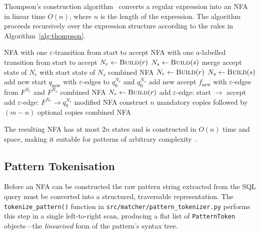 Thompson's construction algorithm~\cite{Thompson1968} converts a
regular expression into an NFA in linear time $O(n)$, where $n$ is
the length of the expression.  The algorithm proceeds recursively
over the expression structure according to the rules in
Algorithm~\ref{alg:thompson}.

\begin{algorithm}[htbp]
\caption{Thompson's NFA Construction}
\label{alg:thompson}
\begin{algorithmic}[1]
    \State \Return NFA with one $\varepsilon$-transition from start to accept
    \State \Return NFA with one $a$-labelled transition from start to accept
    \State $N_r \gets \Call{Build}{r}$
    \State $N_s \gets \Call{Build}{s}$
    \State merge accept state of $N_r$ with start state of $N_s$
    \State \Return combined NFA
    \State $N_r \gets \Call{Build}{r}$
    \State $N_s \gets \Call{Build}{s}$
    \State add new start $q_\text{new}$ with $\varepsilon$-edges to $q_0^{N_r}$ and $q_0^{N_s}$
    \State add new accept $f_\text{new}$ with $\varepsilon$-edges from $F^{N_r}$ and $F^{N_s}$
    \State \Return combined NFA
    \State $N_r \gets \Call{Build}{r}$
    \State add $\varepsilon$-edge: start $\to$ accept 
    \State add $\varepsilon$-edge: $F^{N_r} \to q_0^{N_r}$ 
    \State \Return modified NFA
    \State construct $n$ mandatory copies followed by $(m{-}n)$ optional copies
    \State \Return combined NFA
  \EndIf
\EndProcedure
\end{algorithmic}
\end{algorithm}

The resulting NFA has at most $2n$ states and is constructed in
$O(n)$ time and space, making it suitable for patterns of arbitrary
complexity~\cite{DragonBook}.

\subsection{Pattern Tokenisation}
\label{subsec:meth-pattern-tokeniser}

Before an NFA can be constructed the raw pattern string extracted
from the SQL query must be converted into a structured, traversable
representation.  The \texttt{tokenize\_pattern()} function in
\texttt{src/matcher/pattern\_tokenizer.py} performs this step in a
single left-to-right scan, producing a flat list of
\texttt{PatternToken} objects—the \emph{linearised} form of the
pattern's syntax tree.

